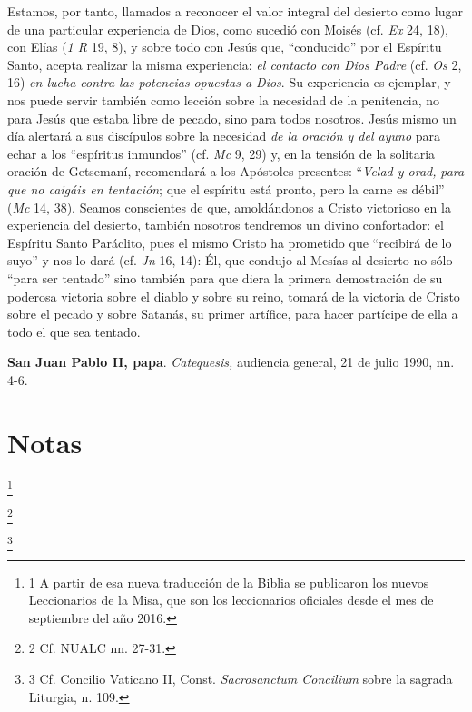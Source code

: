			\begin{patercite}Estamos, por tanto, llamados a reconocer el valor integral del desierto como lugar de una particular experiencia de Dios, como sucedió con Moisés (cf. \textit{Ex }24, 18), con Elías (\textit{1 R} 19, 8), y sobre todo con Jesús que, “conducido” por el Espíritu Santo, acepta realizar la misma experiencia: \textit{el contacto con Dios Padre} (cf. \textit{Os} 2, 16) \textit{en lucha contra las potencias} \textit{opuestas a Dios}. Su experiencia es ejemplar, y nos puede servir también como lección sobre la necesidad de la penitencia, no para Jesús que estaba libre de pecado, sino para todos nosotros. Jesús mismo un día alertará a sus discípulos sobre la necesidad \textit{de la oración y del ayuno }para echar a los “espíritus inmundos” (cf. \textit{Mc} 9, 29) y, en la tensión de la solitaria oración de Getsemaní, recomendará a los Apóstoles presentes: “\textit{Velad y orad,} \textit{para que no caigáis en tentación}; que el espíritu está pronto, pero la carne es débil” (\textit{Mc} 14, 38). Seamos conscientes de que, amoldándonos a Cristo victorioso en la experiencia del desierto, también nosotros tendremos un divino confortador: el Espíritu Santo Paráclito, pues el mismo Cristo ha prometido que “recibirá de lo suyo” y nos lo dará (cf. \textit{Jn} 16, 14): Él, que condujo al Mesías al desierto no sólo “para ser tentado” sino también para que diera la primera demostración de su poderosa victoria sobre el diablo y sobre su reino, tomará de la victoria de Cristo sobre el pecado y sobre Satanás, su primer artífice, para hacer partícipe de ella a todo el que sea tentado.\end{patercite}
			
			\begin{patercite}\textbf{San Juan Pablo II, papa}. \textit{Catequesis,} audiencia general, 21 de julio 1990, nn. 4-6.\end{patercite}
			
			\chapter{Notas}
			
				
			
					\footnote{1 A partir de esa nueva traducción de la Biblia se publicaron los nuevos Leccionarios de la Misa, que son los leccionarios oficiales desde el mes de septiembre del año 2016.}
			
					\footnote{2 Cf. NUALC nn. 27-31. }
			
					\footnote{3 Cf. Concilio Vaticano II, Const. \textit{Sacrosanctum Concilium} sobre la sagrada Liturgia, n. 109.}
			
